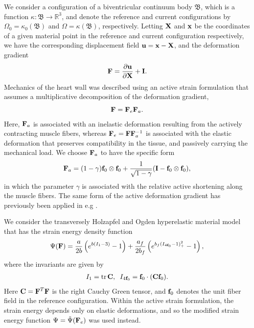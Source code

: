We consider a configuration of a biventricular continuum body
$\mathfrak{B}$, which is a function $\kappa : \mathfrak{B} \rightarrow
\mathbb{R}^3$, and denote the reference and current configurations
by $\Omega_0 = \kappa_0 (\mathfrak{B}) $ and $\Omega = \kappa
(\mathfrak{B}) $, respectively. Letting $\mathbf{X}$ and $\mathbf{x}$
be the coordinates of a given material point in the reference and
current configuration respectively, we have the corresponding
displacement field $\mathbf{u} = \mathbf{x}-\mathbf{X}$, and the deformation gradient 
\begin{align}
  \mathbf{F} = \frac{\partial \mathbf{u}}{\partial \mathbf{X}} + \mathbf{I}.
\end{align}
Mechanics of the heart wall was described using an active strain
formulation \citep{ambrosi2011electromechanical} that assumes a
multiplicative decomposition of the deformation gradient,
\begin{equation}
 \mathbf{F} = \mathbf{F}_e \mathbf{F}_a.
\label{paper3:eq:active_strain}
\end{equation}
Here, $\mathbf{F}_a$ is associated with an inelastic deformation resulting from the
actively contracting muscle fibers, whereas $\mathbf{F}_e = \mathbf{F} \mathbf{F}_a^{-1}$ is
associated with the elastic deformation that preserves compatibility
in the tissue, and passively carrying the mechanical load. We choose
$\mathbf{F}_a$ to have the specific form  
\begin{equation}
  \mathbf{F}_a = (1 - \gamma) \mathbf{f}_0 \otimes \mathbf{f}_0  + \frac{1}{\sqrt{1 - \gamma}} (\mathbf{I} - \mathbf{f}_0 \otimes \mathbf{f}_0),
 \label{paper3:eq:active_strain_Fa_gjerald}
\end{equation}
in which the parameter $\gamma$ is associated with the relative active
shortening along the muscle fibers. The same form of the active
deformation gradient has previously been applied in e.g
\citep{gjerald2014patient,balaban}.


We consider the transversely Holzapfel and Ogden hyperelastic material
\citep{holzapfel2009constitutive} model that has the strain energy
density function
\begin{align}
\label{paper3:eq:holzapfel_ogden}
\Psi(\mathbf{F}) = \frac{a}{2 b} \left( e^{ b (I_1  - 3)}  -1 \right)
 + \frac{a_f}{2 b_f} \left( e^{ b_f (I_{4\mathbf{f}_0} - 1)_+^2} -1 \right),
\end{align}
where the invariants are given by
\begin{align}
  I_1 = \mathrm{tr} \hspace{0.05cm} \mathbf{C}, \;\; I_{4\mathbf{f}_0} = \mathbf{f}_0 \cdot (\mathbf{C} \mathbf{f}_0).
\end{align}
Here $\mathbf{C} = \mathbf{F}^T\mathbf{F}$ is the right Cauchy Green tensor, and $\mathbf{f}_0$ denotes
the unit fiber field in the reference configuration.
Within the active strain formulation, the strain energy depends only on
elastic deformations, and so the modified strain energy function
$\Psi = \tilde{\Psi}(\mathbf{F}_e)$ was used instead. 

